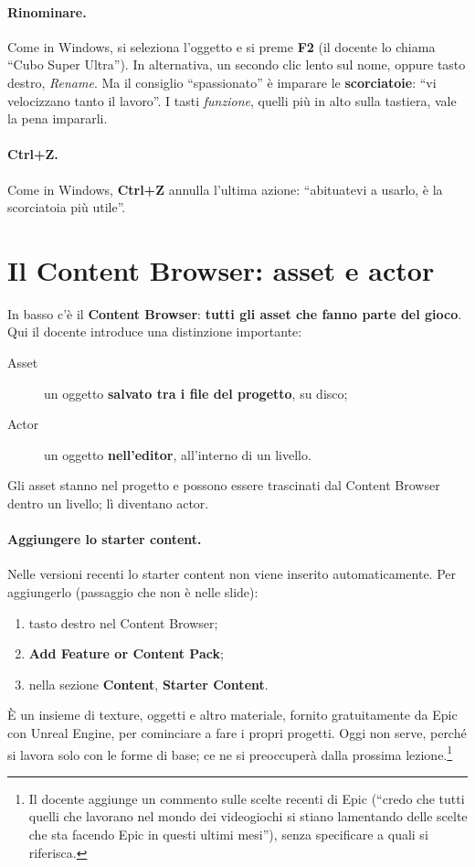 \paragraph{Rinominare.} Come in Windows, si seleziona l'oggetto e si preme
\textbf{F2} (il docente lo chiama ``Cubo Super Ultra''). In alternativa, un
secondo clic lento sul nome, oppure tasto destro, \emph{Rename}. Ma il
consiglio ``spassionato'' è imparare le \textbf{scorciatoie}: ``vi velocizzano
tanto il lavoro''. I tasti \emph{funzione}, quelli più in alto sulla
tastiera, vale la pena impararli.

\paragraph{Ctrl+Z.} Come in Windows, \textbf{Ctrl+Z} annulla l'ultima azione:
``abituatevi a usarlo, è la scorciatoia più utile''.

\section{Il Content Browser: asset e actor}
\label{gd8:sec:content}



In basso c'è il \textbf{Content Browser}: \textbf{tutti gli asset che fanno
parte del gioco}. Qui il docente introduce una distinzione importante:
\begin{description}
  \item[Asset] un oggetto \textbf{salvato tra i file del progetto}, su disco;
  \item[Actor] un oggetto \textbf{nell'editor}, all'interno di un livello.
\end{description}
Gli asset stanno nel progetto e possono essere trascinati dal Content Browser
dentro un livello; lì diventano actor.

\paragraph{Aggiungere lo starter content.} Nelle versioni recenti lo starter
content non viene inserito automaticamente. Per aggiungerlo (passaggio che non
è nelle slide):
\begin{enumerate}
  \item tasto destro nel Content Browser;
  \item \textbf{Add Feature or Content Pack};
  \item nella sezione \textbf{Content}, \textbf{Starter Content}.
\end{enumerate}
È un insieme di texture, oggetti e altro materiale, fornito gratuitamente da
Epic con Unreal Engine, per cominciare a fare i propri progetti. Oggi non
serve, perché si lavora solo con le forme di base; ce ne si preoccuperà dalla
prossima lezione.\footnote{Il docente aggiunge un commento sulle scelte
recenti di Epic (``credo che tutti quelli che lavorano nel mondo dei
videogiochi si stiano lamentando delle scelte che sta facendo Epic in questi
ultimi mesi''), senza specificare a quali si riferisca.}

